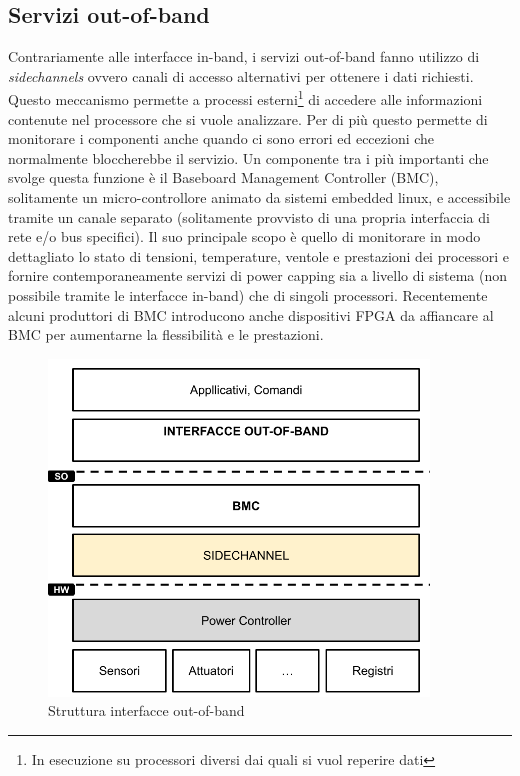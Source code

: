 \subsection{Servizi out-of-band}
Contrariamente alle interfacce in-band, i servizi out-of-band fanno utilizzo di \emph{sidechannels} ovvero canali di accesso alternativi per ottenere i dati richiesti. Questo meccanismo permette a processi esterni\footnote{In esecuzione su processori diversi dai quali si vuol reperire dati} di accedere alle informazioni contenute nel processore che si vuole analizzare. Per di più questo permette di monitorare i componenti anche quando ci sono errori ed eccezioni che normalmente bloccherebbe il servizio. Un componente tra i più importanti che svolge questa funzione è il Baseboard Management Controller (BMC), solitamente un micro-controllore animato da sistemi embedded linux, e accessibile tramite un canale separato (solitamente provvisto di una propria interfaccia di rete e/o bus specifici). Il suo principale scopo è quello di monitorare in modo dettagliato lo stato di tensioni, temperature, ventole e prestazioni dei processori e fornire contemporaneamente servizi di power capping sia a livello di sistema (non possibile tramite le interfacce in-band) che di singoli processori.
Recentemente alcuni produttori di BMC introducono anche dispositivi FPGA da affiancare al BMC per aumentarne la flessibilità e le prestazioni.
\begin{figure}[H]
    \centering
    \includegraphics[width=0.9\textwidth]{img/out-of-band.png}
    \caption{Struttura interfacce out-of-band} 
    \label{fig:inband}
\end{figure}


